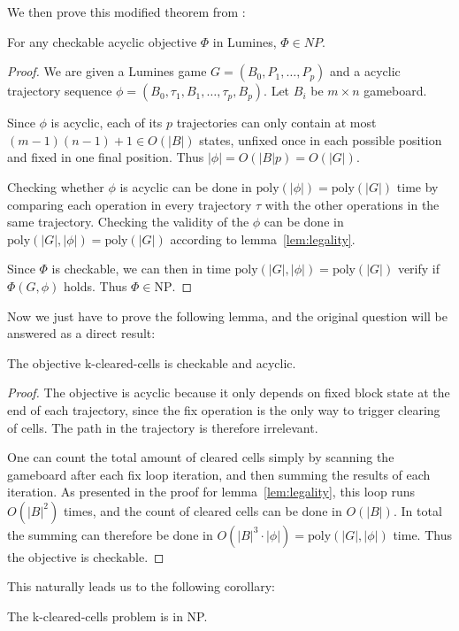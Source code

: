 We then prove this modified theorem from \cite{tetris}: \\

\begin{thm}
\label{thm:npobj}
For any checkable acyclic objective $\Phi$ in Lumines, $\Phi \in NP$.
\end{thm}

\begin{proof}
We are given a Lumines game $G = (B_0, P_1, \ldots, P_p)$ and a acyclic trajectory sequence $\phi = (B_0, \tau_1, B_1, \ldots ,\tau_p, B_p)$. Let $B_i$ be $m \times n$ gameboard.

Since $\phi$ is acyclic, each of its $p$ trajectories can only contain at most $(m-1)(n-1) + 1 \in O(|B|)$ states, unfixed once in each possible position and fixed in one final position. Thus $|\phi| = O(|B|p) = O(|G|)$.

Checking whether $\phi$ is acyclic can be done in $\text{poly}(|\phi|) = \text{poly}(|G|)$ time by comparing each operation in every trajectory $\tau$ with the other operations in the same trajectory. Checking the validity of the $\phi$ can be done in $\text{poly}(|G|, |\phi|) = \text{poly}(|G|)$ according to lemma~\ref{lem:legality}.

Since $\Phi$ is checkable, we can then in time $\text{poly}(|G|, |\phi|) = \text{poly}(|G|)$ verify if $\Phi(G, \phi)$ holds. Thus $\Phi \in \text{NP}$.
\end{proof}

Now we just have to prove the following lemma, and the original question will be answered as a direct result:\\

\begin{lem}
The objective k-cleared-cells is checkable and acyclic.
\end{lem}

\begin{proof}
The objective is acyclic because it only depends on fixed block state at the end of each trajectory, since the fix operation is the only way to trigger clearing of cells. The path in the trajectory is therefore irrelevant. 

One can count the total amount of cleared cells simply by scanning the gameboard after each fix loop iteration, and then summing the results of each iteration. As presented in the proof for lemma~\ref{lem:legality}, this loop runs $O(|B|^2)$ times, and the count of cleared cells can be done in $O(|B|)$. In total the summing can therefore be done in $O(|B|^3 \cdot |\phi|) = \text{poly}(|G|, |\phi|)$ time. Thus the objective is checkable.
\end{proof}

This naturally leads us to the following corollary:\\

\begin{cor}
The k-cleared-cells problem is in NP.
\end{cor}

